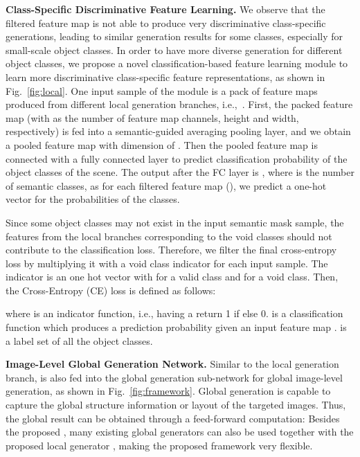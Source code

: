\documentclass[10pt,twocolumn,letterpaper]{article}
\begin{document}
\noindent \textbf{Class-Specific Discriminative Feature Learning.}
We observe that the filtered feature map  is not able to produce very discriminative class-specific generations, leading to similar generation results for some classes, especially for small-scale object classes.
In order to have more diverse generation for different object classes, we propose a novel classification-based feature learning module to learn more  discriminative class-specific feature representations, as shown in Fig.~\ref{fig:local}.
One input sample of the module is a pack of feature maps produced from different local generation branches, i.e.,~.
First, the packed feature map  (with  as the number of feature map channels, height and width, respectively) is fed into a semantic-guided averaging pooling layer, and we obtain a pooled feature map with dimension of .
Then the pooled feature map is connected with a fully connected layer to predict classification probability of the  object classes of the scene. 
The output after the FC layer is , where  is the number of semantic classes, as for each filtered feature map  (), we predict a  one-hot vector for the probabilities of the  classes.

Since some object classes may not exist in the input semantic mask sample, the features from the local branches corresponding to the void classes should not contribute to the classification loss. Therefore, we filter the final cross-entropy loss by multiplying it with a void class indicator for each input sample. The indicator is an one hot vector  with  for a valid class and  for a void class. Then, the Cross-Entropy (CE) loss is defined as follows: 

where  is an indicator function, i.e., having a return 1 if  else 0.   is a classification function which produces a prediction probability given an input feature map .  is a label set of all the object classes.


\par\noindent\textbf{Image-Level Global Generation Network.} Similar to the local generation branch,  is also fed into the global generation sub-network  for global image-level generation, as shown in Fig.~\ref{fig:framework}. Global generation is capable to capture the global structure information or layout of the targeted images. 
Thus, the global result  can be obtained through a feed-forward computation: 
Besides the proposed , many existing global generators can also be used together with the proposed local generator , making the proposed framework very flexible.
\end{document}
